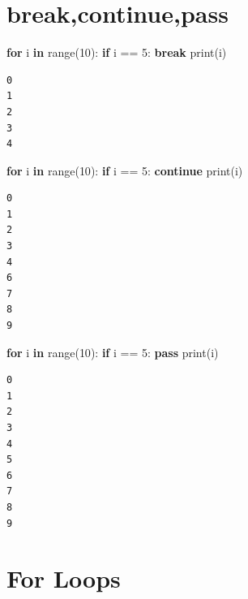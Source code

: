 \documentclass[
  letterpaper,
  DIV=11,
  numbers=noendperiod]{scrreprt}
\newenvironment{Shaded}{\begin{snugshade}}{\end{snugshade}}
\newcommand{\BuiltInTok}[1]{\textcolor[rgb]{0.00,0.23,0.31}{#1}}
\newcommand{\ControlFlowTok}[1]{\textcolor[rgb]{0.00,0.23,0.31}{\textbf{#1}}}
\newcommand{\DecValTok}[1]{\textcolor[rgb]{0.68,0.00,0.00}{#1}}
\newcommand{\KeywordTok}[1]{\textcolor[rgb]{0.00,0.23,0.31}{\textbf{#1}}}
\newcommand{\NormalTok}[1]{\textcolor[rgb]{0.00,0.23,0.31}{#1}}
\newcommand{\OperatorTok}[1]{\textcolor[rgb]{0.37,0.37,0.37}{#1}}
\begin{document}
\section*{break,continue,pass}\label{breakcontinuepass}


\begin{Shaded}
\begin{Highlighting}[]
\ControlFlowTok{for}\NormalTok{ i }\KeywordTok{in} \BuiltInTok{range}\NormalTok{(}\DecValTok{10}\NormalTok{):}
    \ControlFlowTok{if}\NormalTok{ i }\OperatorTok{==} \DecValTok{5}\NormalTok{:}
        \ControlFlowTok{break}
    \BuiltInTok{print}\NormalTok{(i)}
\end{Highlighting}
\end{Shaded}

\begin{verbatim}
0
1
2
3
4
\end{verbatim}

\begin{Shaded}
\begin{Highlighting}[]
\ControlFlowTok{for}\NormalTok{ i }\KeywordTok{in} \BuiltInTok{range}\NormalTok{(}\DecValTok{10}\NormalTok{):}
    \ControlFlowTok{if}\NormalTok{ i }\OperatorTok{==} \DecValTok{5}\NormalTok{:}
        \ControlFlowTok{continue}
    \BuiltInTok{print}\NormalTok{(i)}
\end{Highlighting}
\end{Shaded}

\begin{verbatim}
0
1
2
3
4
6
7
8
9
\end{verbatim}

\begin{Shaded}
\begin{Highlighting}[]
\ControlFlowTok{for}\NormalTok{ i }\KeywordTok{in} \BuiltInTok{range}\NormalTok{(}\DecValTok{10}\NormalTok{):}
    \ControlFlowTok{if}\NormalTok{ i }\OperatorTok{==} \DecValTok{5}\NormalTok{:}
        \ControlFlowTok{pass}
    \BuiltInTok{print}\NormalTok{(i)}
\end{Highlighting}
\end{Shaded}

\begin{verbatim}
0
1
2
3
4
5
6
7
8
9
\end{verbatim}

\section*{For Loops}\label{for-loops}
\end{document}
